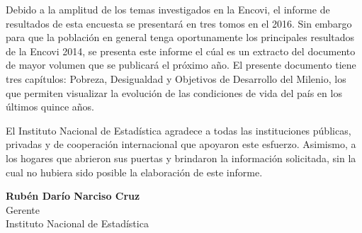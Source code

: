 Debido a la amplitud de los temas investigados en la Encovi, el informe de resultados de esta encuesta se presentará en tres tomos en el 2016. Sin embargo para que la población en general tenga oportunamente    los principales resultados de la Encovi 2014, se presenta este informe el cúal es un extracto del documento de mayor volumen que se publicará el próximo año.  El presente documento tiene tres capítulos: Pobreza, Desigualdad y Objetivos de Desarrollo del Milenio, los que permiten visualizar la evolución de las condiciones de vida del país en los últimos quince años. 


El Instituto Nacional de Estadística agradece a todas las instituciones públicas, privadas y de cooperación internacional que apoyaron este esfuerzo. Asimismo, a los hogares que abrieron sus puertas y  brindaron  la información  solicitada, sin la cual no hubiera sido posible  la elaboración de este informe.\\[1cm] 


\begin{center}
	\textbf{Rubén Darío Narciso Cruz}\\
	Gerente\\
	Instituto Nacional de Estadística
\end{center}

\cleardoublepage
